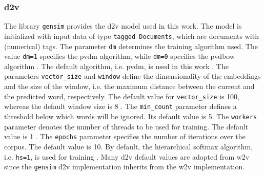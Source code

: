 \subsubsection*{\ac{d2v}}\label{subsubsec:impl-doc2vec}

The library \texttt{gensim} provides the \ac{d2v} model used in this work.
The model is initialized with input data of type \texttt{tagged Documents}, which are documents with (numerical) tags.
The parameter \texttt{dm} determines the training algorithm used.
The value \texttt{dm=1} specifies the \ac{pvdm} algorithm, while \texttt{dm=0} specifies the \ac{pvdbow} algorithm \cite{gensim-doc2vec}.
The default algorithm, i.e. \ac{pvdm}, is used in this work \cite{gensim-word2vec-init}.
The parameters \texttt{vector\_size} and \texttt{window} define the dimensionality of the embeddings and the size of the window, 
i.e. the maximum distance between the current and the predicted word, respectively.
The default value for \texttt{vector\_size} is 100, whereas the default window size is 8 \cite{gensim-word2vec-init, gensim-doc2vec-init}.
The \texttt{min\_count} parameter defines a threshold below which words will be ignored.
Its default value is 5.
The \texttt{workers} parameter denotes the number of threads to be used for training.
The default value is 1 \cite{gensim-word2vec-init}.
The \texttt{epochs} parameter specifies the number of iterations over the corpus.
The default value is 10.
By default, the hierarchical softmax algorithm, i.e. \texttt{hs=1}, is used for training \cite{gensim-doc2vec}.
Many \ac{d2v} default values are adopted from \ac{w2v} since the \texttt{gensim} \ac{d2v} implementation inherits from the \ac{w2v} implementation.
